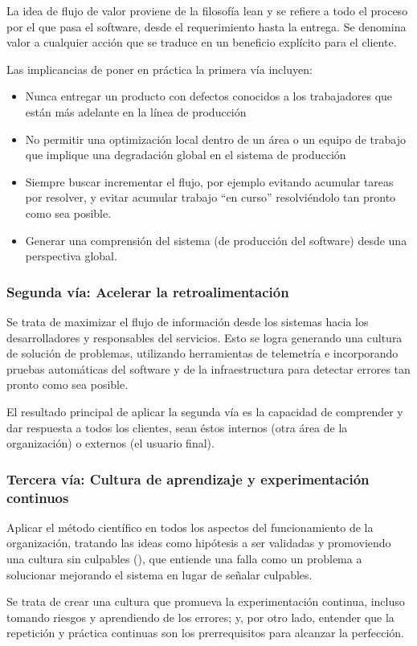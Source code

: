 La idea de flujo de valor proviene de la filosofía lean y se refiere a
todo el proceso por el que pasa el software, desde el requerimiento
hasta la entrega. Se denomina valor a cualquier acción que se traduce
en un beneficio explícito para el cliente.

Las implicancias de poner en práctica la primera vía incluyen:
%
\begin{itemize}
\item Nunca entregar un producto con defectos conocidos a los
  trabajadores que están más adelante en la línea de producción
\item No permitir una optimización local dentro de un área o un equipo
  de trabajo que implique una degradación global en el sistema de
  producción
\item Siempre buscar incrementar el flujo, por ejemplo evitando
  acumular tareas por resolver, y evitar acumular trabajo ``en curso''
  resolviéndolo tan pronto como sea posible.
\item Generar una comprensión del sistema (de producción del software)
  desde una perspectiva global.
\end{itemize}
%
\subsubsection{Segunda vía: Acelerar la retroalimentación}
%
Se trata de maximizar el flujo de información desde los sistemas hacia
los desarrolladores y responsables del servicios. Esto se logra
generando una cultura de solución de problemas, utilizando
herramientas de telemetría e incorporando pruebas automáticas del
software y de la infraestructura para detectar errores tan pronto como
sea posible.

El resultado principal de aplicar la segunda vía es la capacidad de
comprender y dar respuesta a todos los clientes, sean éstos internos
(otra área de la organización) o externos (el usuario final).
%
\subsubsection{Tercera vía: Cultura de aprendizaje y experimentación continuos}
%
Aplicar el método científico en todos los aspectos del funcionamiento
de la organización, tratando las ideas como hipótesis a ser validadas
y promoviendo una cultura sin culpables (), que
entiende una falla como un problema a solucionar mejorando el sistema
en lugar de señalar culpables.

Se trata de crear una cultura que promueva la experimentación
continua, incluso tomando riesgos y aprendiendo de los errores; y, por
otro lado, entender que la repetición y práctica continuas son los
prerrequisitos para alcanzar la perfección.

